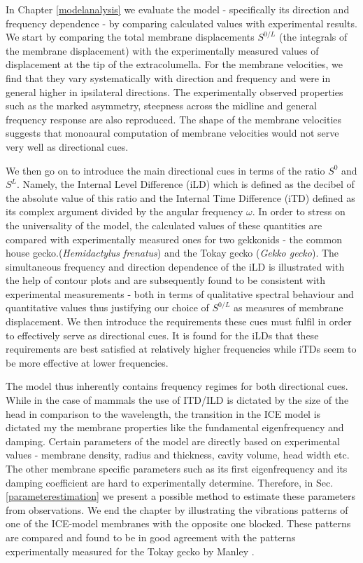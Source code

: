 In Chapter \ref{modelanalysis} we evaluate the model - specifically its direction and frequency dependence - 
by comparing calculated values with experimental results. We start
by comparing the total membrane displacements $S^{0/L}$ (the integrals of the membrane displacement) with the experimentally 
measured values of displacement at the tip of the extracolumella. 
For the membrane velocities, we find that they vary systematically with
direction and frequency and were in general higher in ipsilateral directions. The experimentally observed properties such
as the marked asymmetry, steepness across the midline and general frequency response are also reproduced. The shape of the membrane
velocities suggests that monoaural computation of membrane velocities would not serve very well as directional cues.

We then go on to introduce the main directional cues in terms of the ratio $S^{0}$ and $S^{L}$. Namely, the Internal Level Difference
(iLD) which is defined as the decibel of the absolute value of this ratio and the Internal Time Difference (iTD) defined as its complex
argument divided by the angular frequency $\omega$. In order to stress on the universality of the model, the calculated values of these
 quantities are compared with experimentally measured ones for two gekkonids - the common house gecko.(\emph{Hemidactylus frenatus}) and the Tokay gecko
 (\emph{Gekko gecko}). The simultaneous frequency and direction dependence of the iLD is illustrated with the help
 of contour plots and are subsequently found to be consistent with experimental measurements - both in terms of qualitative spectral behaviour and
quantitative values thus justifying our choice of $S^{0/L}$ as measures of membrane displacement. We then introduce the requirements these cues must fulfil in order to effectively serve as
directional cues. It is found for the iLDs that these requirements are best satisfied at relatively higher frequencies while
 iTDs seem to be more effective at lower frequencies.
 
The model thus inherently contains frequency regimes for both directional cues. While in the case of mammals the use of ITD/ILD
is dictated by the size of the head in comparison to the wavelength, the transition in the ICE model is dictated my the membrane
properties like the fundamental eigenfrequency and damping. Certain parameters of the model are directly based on experimental
values - membrane density, radius and thickness, cavity volume, head width etc. The other membrane specific parameters such
as its first eigenfrequency and its damping coefficient are hard to experimentally determine. Therefore, in Sec. \ref{parameterestimation} we present
a possible method to estimate these parameters from observations. We end the chapter by illustrating the vibrations patterns of one of the ICE-model
membranes with the opposite one blocked. These patterns are compared and found to be in good agreement with the patterns experimentally measured for the Tokay gecko 
by Manley \cite{manleygecko1}.
